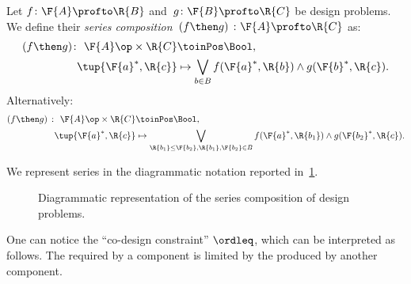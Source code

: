 \begin{definition}
  \label{def:dp-series}
  Let $f \colon  \F{A} \profto \R{B}$ and~$g \colon \F{B} \profto \R{C}$ be design problems. We define their \emph{series composition}~$(f\then g)\ \colon  \F{A} \profto \R{C}$ as:
  \begin{equation}
    \label{eq:composition2}
    \begin{aligned}
      (f \then g)  \colon \ \F{A}\op \times \R{C} & \toinPos  \Bool, \\
      \tup{\F{a}^*, \R{c}} &\mapsto \bigvee_{b\in B} f(\F{a}^*,\R{b}) \wedge g(\F{b}^*,\R{c}).
    \end{aligned}
  \end{equation}
  Alternatively:
  \begin{equation}
    \begin{aligned}
      \label{eq:composition}
      (f \then g)\  \colon \ \F{A}\op \times \R{C} & \toinPos  \Bool,  \\
      \tup{\F{a}^*, \R{c}} &\mapsto \bigvee_{\R{b_1}\leq\F{b_2}, \R{b_1},\F{b_2}\in B} f(\F{a}^*,\R{b_1}) \wedge g(\F{b_2}^*,\R{c}).
    \end{aligned}
  \end{equation}
\end{definition}
\noindent We represent series in the diagrammatic notation reported in~\cref{fig:compositiondiagram}.
\begin{figure}[h!]
  \begin{center}
  \end{center}
  \caption{Diagrammatic representation of the series composition of design problems. \label{fig:compositiondiagram}}
\end{figure}

One can notice the ``co-design constraint'' $\ordleq$, which can be interpreted as follows. The  required by a component is limited by the  produced by another component.

